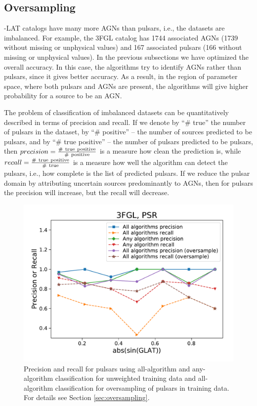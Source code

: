 \subsection{Oversampling}

\Fermi-LAT catalogs have many more AGNs than pulsars, i.e., the datasets are imbalanced.
For example, the 3FGL catalog has 1744 associated AGNs (1739 without missing or unphysical values)
and 167 associated pulsars (166 without missing or unphysical values).
In the previous subsections we have optimized the overall accuracy. In this case, the algorithms try to identify AGNs rather than pulsars,
since it gives better accuracy. As a result, in the region of parameter space, where both pulsars and AGNs are present, the algorithms
will give higher probability for a source to be an AGN.


The problem of classification of imbalanced datasets can be quantitatively described in terms of precision and recall.
If we denote by ``\# true'' the number of pulsars in the dataset, by ``\# positive'' -- the number of sources predicted to be pulsars, and by 
``\# true positive'' -- the number of pulsars predicted to be pulsars, then  $precision \rm = \frac{\#\ true\ positive}{\#\ positive}$ is a measure how clean the prediction is, while $recall \rm = \frac{\#\ true\ positive}{\#\ true}$ is a measure how well the algorithm can detect the pulsars, i.e., how complete is the list of predicted pulsars.
If we reduce the pulsar domain by attributing uncertain sources predominantly to AGNs, then for pulsars the precision will increase, but the recall will decrease.



\begin{figure}[h]
\centering
\includegraphics[width=\twopicsp\textwidth]{plots/all_algs_3FGL_precision_recall_oversample_PSR.pdf}
\caption{Precision and recall for pulsars using all-algorithm and any-algorithm classification for unweighted training data and
all-algorithm classification for oversampling of pulsars in training data. For details see Section \ref{sec:oversampling}.}
\label{fig:prec_recall}
\end{figure}



